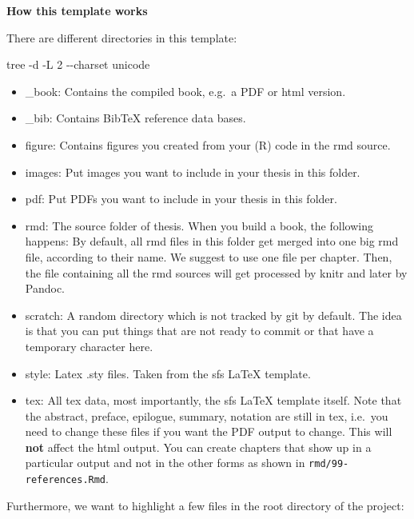 \documentclass[11pt,a4paper,twoside,openright]{report}
\theoremstyle{definition}
\numberwithin{equation}{subsection}
\providecommand{\tightlist}{%
  \setlength{\itemsep}{0pt}\setlength{\parskip}{0pt}}
\newenvironment{Shaded}{\begin{snugshade}}{\end{snugshade}}
\newcommand{\AttributeTok}[1]{\textcolor[rgb]{0.13,0.29,0.53}{#1}}
\newcommand{\ExtensionTok}[1]{#1}
\newcommand{\NormalTok}[1]{#1}
\begin{document}
\textbf{How this template works}

There are different directories in this template:

\begin{Shaded}
\begin{Highlighting}[]
\ExtensionTok{tree} \AttributeTok{{-}d} \AttributeTok{{-}L}\NormalTok{ 2 }\AttributeTok{{-}{-}charset}\NormalTok{ unicode}
\end{Highlighting}
\end{Shaded}

\begin{itemize}
\tightlist
\item
  \_book: Contains the compiled book, e.g.~a PDF or html version.
\item
  \_bib: Contains BibTeX reference data bases.
\item
  figure: Contains figures you created from your (R) code in the rmd source.
\item
  images: Put images you want to include in your thesis in this folder.
\item
  pdf: Put PDFs you want to include in your thesis in this folder.
\item
  rmd: The source folder of thesis. When you build a book, the following
  happens: By default, all rmd files in this folder get merged into one big rmd
  file, according to their name. We suggest to use one file per chapter. Then, the
  file containing all the rmd sources will get processed by knitr and later by
  Pandoc.
\item
  scratch: A random directory which is not tracked by git by default. The idea
  is that you can put things that are not ready to commit or that have a temporary
  character here.
\item
  style: Latex .sty files. Taken from the sfs LaTeX template.
\item
  tex: All tex data, most importantly, the sfs LaTeX template itself. Note that
  the abstract, preface, epilogue, summary, notation are still in tex, i.e.~you
  need to change these files if you want the PDF output to change. This will
  \textbf{not} affect the html output. You can create chapters that show up in a
  particular output and not in the other forms as shown in
  \texttt{rmd/99-references.Rmd}.
\end{itemize}

Furthermore, we want to highlight a few files in the root directory of the
project:
\end{document}
